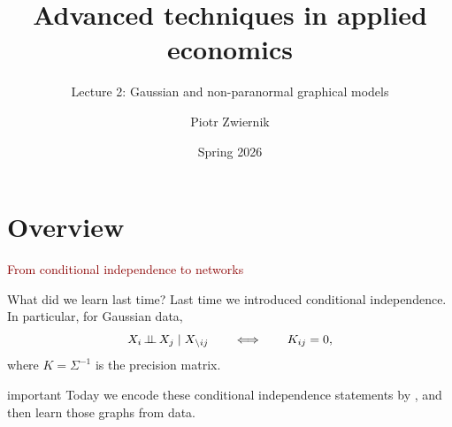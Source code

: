 \documentclass[dvipsnames,aspectratio=169,handout]{beamer}
\title{Advanced techniques in applied economics}
\subtitle{Lecture 2: Gaussian and non-paranormal graphical models}
\author{Piotr Zwiernik}
\date{Spring 2026}
\begin{document}

\begin{frame}
\titlepage
\end{frame}


\section{Overview}

\begin{frame}{}
\begin{center}
{\huge \textcolor{DarkRed}{From conditional independence to networks}}
\end{center}
\end{frame}

\begin{frame}{What did we learn last time?}
Last time we introduced conditional independence.
In particular, for Gaussian data,
\[
X_i\mbox{\,$\perp\!\!\!\perp$\,} X_j\mid X_{\setminus ij}
\qquad\Longleftrightarrow\qquad
K_{ij}=0,
\]
where $K=\Sigma^{-1}$ is the precision matrix.

\begin{beamercolorbox}[wd=\textwidth,sep=7pt,center,rounded=true,shadow=true]{important}
Today we encode these conditional independence statements by ,
and then learn those graphs from data.
\end{beamercolorbox}
\end{frame}
\end{document}
